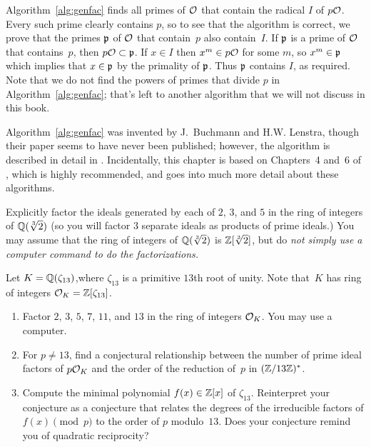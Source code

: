 Algorithm~\ref{alg:genfac} finds all primes of $\mathcal{O}$ that contain the radical $I$ of
$p\mathcal{O}$.  Every such prime clearly contains $p$, so to see that the
algorithm is correct, we prove that the primes $\mathfrak{p}$ of $\mathcal{O}$ that
contain~$p$ also contain~$I$.  If $\mathfrak{p}$ is a prime of $\mathcal{O}$ that
contains~$p$, then $p\mathcal{O} \subset \mathfrak{p}$.  If $x\in I$ then $x^m\in p\mathcal{O}$
for some $m$, so $x^m\in \mathfrak{p}$ which implies that $x\in \mathfrak{p}$ by the primality
of $\mathfrak{p}$.  Thus $\mathfrak{p}$ contains $I$, as required.  Note that we do not find the powers of
primes that divide $p$ in Algorithm~\ref{alg:genfac}; that's left to another
algorithm that we will not discuss in this book.

Algorithm~\ref{alg:genfac} was invented by J.~Buchmann and
H.\thinspace{}W. Lenstra, though their paper seems to have never been
published; however, the algorithm is described in detail in
\cite[\S6.2.5]{cohen:course_ant}.  Incidentally, this chapter is based
on Chapters~4 and~6 of \cite{cohen:course_ant}, which is highly
recommended, and goes into much more detail about these algorithms.

\begin{exercise}
	Explicitly factor the ideals generated by each of $2$, $3$, and $5$ in
	the ring of integers of $\mathbb{Q}(\sqrt[3]{2})$ (so you will factor $3$
	separate ideals as products of prime ideals.)
	You may assume that the ring of integers of $\mathbb{Q}(\sqrt[3]{2})$
	is $\mathbb{Z}[\sqrt[3]{2}]$, but do \em{not} simply use a computer command to do
	the factorizations.
\end{exercise}

\begin{exercise}
	Let $K=\mathbb{Q}(\zeta_{13})$,where $\zeta_{13}$ is a primitive $13$th root of
	unity. Note that~$K$ has ring of integers $\mathcal{O}_K=\mathbb{Z}[\zeta_{13}]$.
	\begin{enumerate}
		\item Factor $2$, $3$, $5$, $7$, $11$, and $13$ in the ring
		of integers $\mathcal{O}_K$.  You may use a computer.
		\item For $p\neq 13$, find a conjectural
		relationship between the number of prime ideal factors of $p\mathcal{O}_K$
		and the order of the reduction of~$p$  in $(\mathbb{Z}/13\mathbb{Z})^*$.
		\item Compute the minimal polynomial $f(x)\in\mathbb{Z}[x]$ of $\zeta_{13}$.
		Reinterpret your conjecture as a conjecture that
		relates the degrees of the irreducible factors of $f(x)\pmod{p}$ to
		the order of $p$ modulo~$13$. Does your conjecture
		remind you of quadratic reciprocity?
	\end{enumerate}
\end{exercise}



